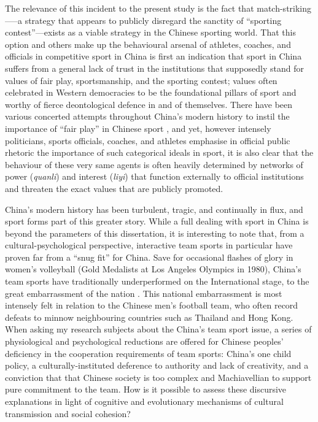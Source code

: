 The relevance of this incident to the present study is the fact that match-striking—--a strategy that appears to publicly disregard the sanctity of ``sporting contest''---exists as a viable strategy in the Chinese sporting world. That this option and others make up the behavioural arsenal of athletes, coaches, and officials in competitive sport in China is first an indication that sport in China suffers from a general lack of trust in the institutions that supposedly stand for values of fair play, sportsmanship, and the sporting contest; values often celebrated in Western democracies to be the foundational pillars of sport and worthy of fierce deontological defence in and of themselves\citep{Morris2004,Gold2002,Yuki2005}.
There have been various concerted attempts throughout China's modern history to instil the importance of ``fair play'' in Chinese sport \citep{Morris2004,Brownell1995,Brownell2008}, and yet, however intensely politicians, sports officials, coaches, and athletes emphasise in official public rhetoric the importance of such categorical ideals in sport, it is also clear that the behaviour of these very same agents is often heavily determined by networks of power (\textit{quanli}) and interest (\textit{liyi}) that function externally to official institutions and threaten the exact values that are publicly promoted.

China's modern history has been turbulent, tragic, and continually in flux, and sport forms part of this greater story.  While a full dealing with sport in China is beyond the parameters of this dissertation, it is interesting to note that, from a cultural-psychological perspective, interactive team sports in particular have proven far from a ``snug fit'' for China.  Save for occasional flashes of glory in women's volleyball (Gold Medalists at Los Angeles Olympics in 1980), China's team sports have traditionally underperformed on the International stage, to the great embarrassment of the nation \citep{Brownell2008}.  This national embarrassment is most intensely felt in relation to the Chinese men's football team, who often record defeats to minnow neighbouring countries such as Thailand and Hong Kong. When asking my research subjects about the China's team sport issue, a series of physiological and psychological reductions are offered for Chinese peoples' deficiency in the cooperation requirements of team sports: China's one child policy, a culturally-instituted deference to authority and lack of creativity, and a conviction that that Chinese society is too complex and Machiavellian to support pure commitment to the team.  How is it possible to assess these discursive explanations in light of cognitive and evolutionary mechanisms of cultural transmission and social cohesion?

